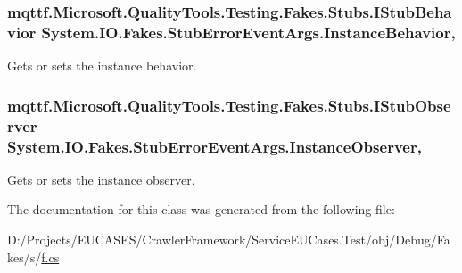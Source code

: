 \hypertarget{class_system_1_1_i_o_1_1_fakes_1_1_stub_error_event_args_a21004becf5bc545d9a6894bc17245af5}{
\subsubsection[{Instance\-Behavior}]{\setlength{\rightskip}{0pt plus 5cm}mqttf.\-Microsoft.\-Quality\-Tools.\-Testing.\-Fakes.\-Stubs.\-I\-Stub\-Behavior System.\-I\-O.\-Fakes.\-Stub\-Error\-Event\-Args.\-Instance\-Behavior\hspace{0.3cm}{\ttfamily [get]}, {\ttfamily [set]}}}\label{class_system_1_1_i_o_1_1_fakes_1_1_stub_error_event_args_a21004becf5bc545d9a6894bc17245af5}


Gets or sets the instance behavior.

\hypertarget{class_system_1_1_i_o_1_1_fakes_1_1_stub_error_event_args_a5a6a6009c889d7bdf2b930200b57e46e}{
\subsubsection[{Instance\-Observer}]{\setlength{\rightskip}{0pt plus 5cm}mqttf.\-Microsoft.\-Quality\-Tools.\-Testing.\-Fakes.\-Stubs.\-I\-Stub\-Observer System.\-I\-O.\-Fakes.\-Stub\-Error\-Event\-Args.\-Instance\-Observer\hspace{0.3cm}{\ttfamily [get]}, {\ttfamily [set]}}}\label{class_system_1_1_i_o_1_1_fakes_1_1_stub_error_event_args_a5a6a6009c889d7bdf2b930200b57e46e}


Gets or sets the instance observer.



The documentation for this class was generated from the following file\-:\begin{DoxyCompactItemize}
\item 
D\-:/\-Projects/\-E\-U\-C\-A\-S\-E\-S/\-Crawler\-Framework/\-Service\-E\-U\-Cases.\-Test/obj/\-Debug/\-Fakes/s/\hyperlink{s_2f_8cs}{f.\-cs}\end{DoxyCompactItemize}
